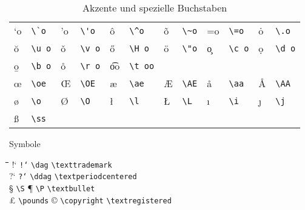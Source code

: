 \begin{table}[tbp]
\caption{Akzente und spezielle Buchstaben} \label{akzente}
\centering
\begin{tabular}{@{}*{6}{l@{\quad}l@{\qquad}}@{}}
\a`o  &   \lstinline|\`o| & \a'o  & \lstinline|\'o| & \^o   &   \lstinline|\^o| &
\~o   &   \lstinline|\~o| & \a=o  & \lstinline|\=o| & \.o   &   \lstinline|\.o| \\
\u o  &   \lstinline|\u o| & \v o  & \lstinline|\v o| & \H o  &   \lstinline|\H o| &
\"o   &   \lstinline|\"o| & \c o  & \lstinline|\c o| & \d o  &   \lstinline|\d o| \\
\b o  &   \lstinline|\b o| & \r o  & \lstinline|\r o| & \t oo &   \lstinline|\t oo| \\[6pt]
\oe   &   \lstinline|\oe| & \OE   & \lstinline|\OE| & \ae   &   \lstinline|\ae| &
\AE   &   \lstinline|\AE| & \aa   & \lstinline|\aa| & \AA   &   \lstinline|\AA| \\
\o    &   \lstinline|\o| & \O    & \lstinline|\O| & \l    &   \lstinline|\l| &
\L    &   \lstinline|\L| & \i    & \lstinline|\i| & \j    &   \lstinline|\j| \\
\ss   &   \lstinline|\ss| \\
\end{tabular}

\end{table}

\begin{table}[tbp]
  \caption{Symbole} \label{specials}
   \begin{tabbing}
   \hspace{1cm}\=\hspace{3.15cm}\=  \hspace{1cm}\=\hspace{3.15cm}\=
   \hspace{1cm}\=\hspace{3.5cm}\=  \kill
!` \> \texttt{!{}`}      \> \dag \> \lstinline|\dag|            \> \texttrademark  \> \lstinline|\texttrademark|   \\
?` \> \texttt{?{}`}      \> \ddag \> \lstinline|\ddag|          \> \textperiodcentered \> \lstinline|\textperiodcentered| \\
\S \> \lstinline|\S|          \> \P \> \lstinline|\P|                \> \textbullet    \> \lstinline|\textbullet| \\
\pounds\> \lstinline|\pounds| \> \copyright \> \lstinline|\copyright|\>\textregistered  \> \lstinline|\textregistered| \\
   \end{tabbing}
\end{table}


